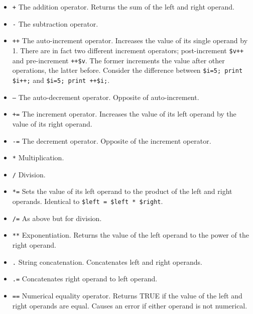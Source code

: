 \documentclass[11pt]{article}
\begin{document}
\begin{itemize}
\item \texttt{+} The addition operator. Returns the sum of the left and right
operand.

\item \texttt{-} The subtraction operator.

\item \texttt{++} The auto-increment operator. Increases the value of its single
operand by 1. There are in fact two different increment operators;
post-increment \texttt{\$v++} and pre-increment \texttt{++\$v}. The former increments
the value after other operations, the latter before. Consider the
difference between \texttt{\$i=5; print \$i++;} and \texttt{\$i=5; print ++\$i;}.

\item \texttt{–} The auto-decrement operator. Opposite of auto-increment.

\item \texttt{+=} The increment operator. Increases the value of its left operand
by the value of its right operand.

\item \texttt{-=} The decrement operator. Opposite of the increment operator.

\item \texttt{*} Multiplication.

\item \texttt{/} Division.

\item \texttt{*=} Sets the value of its left operand to the product of the left
and right operands. Identical to \texttt{\$left = \$left * \$right}.

\item \texttt{/=} As above but for division.

\item \texttt{**} Exponentiation. Returns the value of the left operand to the
power of the right operand.

\item \texttt{.} String concatenation. Concatenates left and right operands.

\item \texttt{.=} Concatenates right operand to left operand.

\item \texttt{==} Numerical equality operator. Returns TRUE if the value of the
left and right operands are equal. Causes an error if either
operand is not numerical.


\end{itemize}
\end{document}
